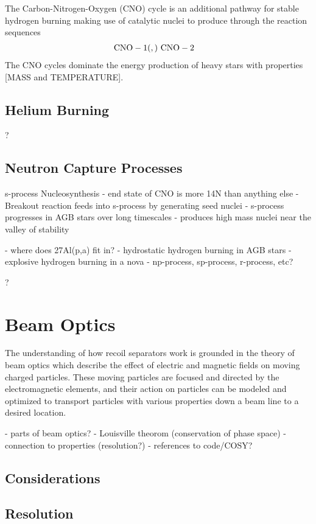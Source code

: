The Carbon-Nitrogen-Oxygen (CNO) cycle is an additional pathway for stable
hydrogen burning making use of catalytic nuclei to produce  through
the reaction sequences
\begin{align*}
    \rm{CNO-1}& (,) \
    \rm{CNO-2}&
\end{align*}
The CNO cycles dominate the energy production of heavy stars with properties
[MASS and TEMPERATURE].

\subsection{Helium Burning}
?
\subsection{Neutron Capture Processes}

s-process Nucleosynthesis
- end state of CNO is more 14N than anything else
- Breakout reaction feeds into s-process by generating seed nuclei
- s-process progresses in AGB stars over long timescales
- produces high mass nuclei near the valley of stability

- where does 27Al(p,a) fit in?
- hydrostatic hydrogen burning in AGB stars
- explosive hydrogen burning in a nova
- np-process, sp-process, r-process, etc?

?


\section{Beam Optics}
\label{sec:ch01-beam-optics}

The understanding of how recoil separators work is grounded in the theory of
beam optics which describe the effect of electric and magnetic fields on moving
charged particles. These moving particles are focused and directed by the
electromagnetic elements, and their action on particles can be modeled and
optimized to transport particles with various properties down a beam line to a
desired location.

- parts of beam optics?
- Louisville theorom (conservation of phase space)
- connection to properties (resolution?)
- references to code/COSY?

\subsection{Considerations}
\subsection{Resolution}

